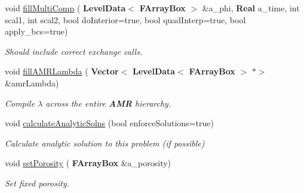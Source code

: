 \begin{DoxyCompactItemize}
\mbox{\label{class_a_m_r_level_mushy_layer_aa47f13f40861dc812b16e8bb2ba607db}} 
void \hyperlink{class_a_m_r_level_mushy_layer_aa47f13f40861dc812b16e8bb2ba607db}{fill\+Multi\+Comp} (\textbf{ Level\+Data}$<$ \textbf{ F\+Array\+Box} $>$ \&a\+\_\+phi, \textbf{ Real} a\+\_\+time, int scal1, int scal2, bool do\+Interior=true, bool quad\+Interp=true, bool apply\+\_\+bcs=true)
\begin{DoxyCompactList}\small\item\em Should include correct exchange calls. \end{DoxyCompactList}\item 
\mbox{\label{class_a_m_r_level_mushy_layer_a3bd5a285797a695854292545b8342c75}} 
void \hyperlink{class_a_m_r_level_mushy_layer_a3bd5a285797a695854292545b8342c75}{fill\+A\+M\+R\+Lambda} (\textbf{ Vector}$<$ \textbf{ Level\+Data}$<$ \textbf{ F\+Array\+Box} $>$ $\ast$$>$ \&amr\+Lambda)
\begin{DoxyCompactList}\small\item\em Compile $ \lambda $ across the entire \textbf{ A\+MR} hierarchy. \end{DoxyCompactList}\item 
\mbox{\label{class_a_m_r_level_mushy_layer_a7aef043fd3a6055c2240b297c0c62de1}} 
void \hyperlink{class_a_m_r_level_mushy_layer_a7aef043fd3a6055c2240b297c0c62de1}{calculate\+Analytic\+Solns} (bool enforce\+Solutions=true)
\begin{DoxyCompactList}\small\item\em Calculate analytic solution to this problem (if possible) \end{DoxyCompactList}\item 
\mbox{\label{class_a_m_r_level_mushy_layer_a649d148960a286ead48d991f696ef945}} 
void \hyperlink{class_a_m_r_level_mushy_layer_a649d148960a286ead48d991f696ef945}{set\+Porosity} (\textbf{ F\+Array\+Box} \&a\+\_\+porosity)
\begin{DoxyCompactList}\small\item\em Set fixed porosity. \end{DoxyCompactList}\item 
\mbox{\label{class_a_m_r_level_mushy_layer_aec845e1d2322bb91f229e21fe9131362}} 
$$
\end{DoxyCompactItemize}

